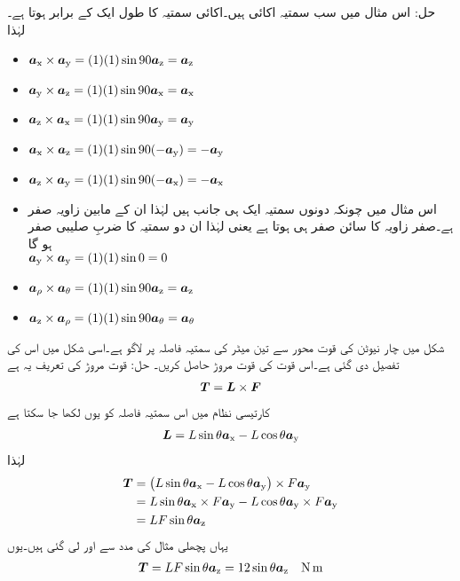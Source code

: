 حل: اس مثال میں سب سمتیہ اکائی ہیں۔اکائی سمتیہ کا طول ایک کے برابر ہوتا ہے۔ لہٰذا
\begin{itemize}
\item
$\ax \times \ay=(1)(1) \sin 90 \az =\az$\\
\item
$\ay \times \az=(1)(1) \sin 90 \ax =\ax$\\
\item
$\az \times \ax=(1)(1) \sin 90 \ay =\ay$\\
\item
$\ax \times \az=(1)(1) \sin 90 (-\ay) =-\ay$\\
\item
$\az \times \ay=(1)(1) \sin 90 (-\ax) =-\ax$\\
\item
اس مثال میں چونکہ دونوں سمتیہ ایک ہی جانب ہیں لہٰذا ان کے مابین زاویہ صفر ہے۔صفر زاویہ کا سائن صفر ہی ہوتا ہے یعنی  لہٰذا ان دو سمتیہ کا ضربِ صلیبی صفر ہو گا\\
$\ay \times \ay=(1)(1) \sin 0  =0$\\
\item
$\arho \times \atheta=(1)(1) \sin 90  \az =\az$\\
\item
$\az \times \arho=(1)(1) \sin 90 \atheta =\atheta $\\
\end{itemize}
%
شکل  میں  چار نیوٹن کی قوت  محور سے تین میٹر کی سمتیہ فاصلہ   پر لاگو ہے۔اسی شکل میں اس کی تفصیل دی گئی ہے۔اس قوت کی قوت مروڑ  حاصل کریں۔
	حل:
	قوت مروڑ  کی تعریف یہ ہے
\begin{align}
\kvec{T}=\kvec{L} \times \kvec{F}
\end{align}
کارتیسی نظام میں اس سمتیہ فاصلہ کو یوں لکھا جا سکتا ہے
\begin{align}
\kvec{L}=L \sin \theta \ax-L \cos \theta \ay
\end{align}
لہٰذا
\begin{align*}
\kvec{T}&=\left(L \sin \theta \ax-L \cos \theta \ay \right) \times F \ay\\
&=L \sin \theta \ax \times F \ay-L \cos \theta \ay \times F \ay\\
&= L F \sin \theta \az
\end{align*} 
یہاں پچھلی مثال کی مدد سے  اور  لی گئی ہیں۔یوں
\begin{align*}
\kvec{T}= L F \sin \theta \az=12 \sin \theta \az \quad \si{\newton \meter}
\end{align*}
